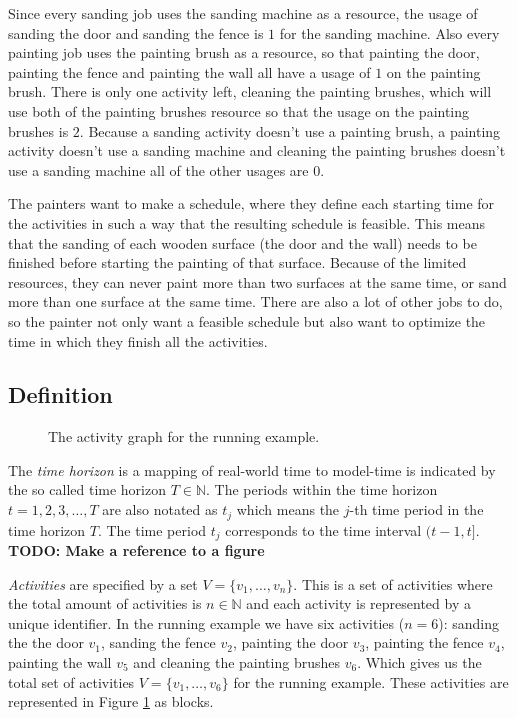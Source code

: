 \documentclass{article}
\theoremstyle{definition}
\newcommand{\TODO}[1]{{\color{red}\textbf{TODO: #1}}}
\begin{document}
Since every sanding job uses the sanding machine as a resource, the usage of sanding the door and sanding the fence is $1$ for the sanding machine.
Also every painting job uses the painting brush as a resource, so that painting the door, painting the fence and painting the wall all have a usage of $1$ on the painting brush.
There is only one activity left, cleaning the painting brushes, which will use both of the painting brushes resource so that the usage on the painting brushes is $2$.
Because a sanding activity doesn't use a painting brush, a painting activity doesn't use a sanding machine and cleaning the painting brushes doesn't use a sanding machine all of the other usages are $0$.

The painters want to make a schedule, where they define each starting time for the activities in such a way that the resulting schedule is feasible.
This means that the sanding of each wooden surface (the door and the wall) needs to be finished before starting the painting of that surface.
Because of the limited resources, they can never paint more than two surfaces at the same time, or sand more than one surface at the same time.
There are also a lot of other jobs to do, so the painter not only want a feasible schedule but also want to optimize the time in which they finish all the activities.

\subsection{Definition}

\begin{figure}[h]
	\centering
	
	\caption{The activity graph for the running example. }
	\label{fig:activity_graph}
\end{figure}

The \emph{time horizon} is a mapping of real-world time to model-time is indicated by the so called time horizon $T \in \mathbb{N}$.
The periods within the time horizon $t=1,2,3,\ldots,T$ are also notated as $t_j$ which means the $j$-th time period in the time horizon $T$. 
The time period $t_j$ corresponds to the time interval $(t-1,t]$. 
\TODO{Make a reference to a figure}

\emph{Activities} are specified by a set $V = \{v_1, \ldots, v_n\}$.
This is a set of activities where the total amount of activities is $n \in \mathbb{N}$ and each activity is represented by a unique identifier. %
In the running example we have six activities ($n = 6$): sanding the the door $v_1$, sanding the fence $v_2$,  painting the door $v_3$, painting the fence $v_4$, painting the wall $v_5$ and cleaning the painting brushes $v_6$.
Which gives us the total set of activities $V = \{v_1, \ldots, v_6\}$ for the running example.
These activities are represented in Figure \ref{fig:activity_graph} as blocks.
\end{document}

